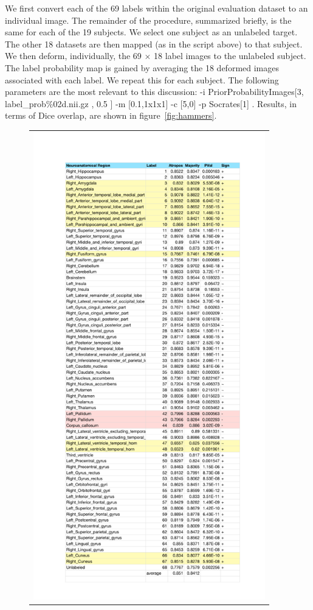 \documentclass[11pt,english]{article}
\begin{document}
{We first convert each of the 69 labels within the original evaluation
dataset to an individual image.  The remainder of the procedure,
summarized briefly, is the same for each of the 19 subjects.  We
select one subject as an unlabeled target.  The other 18 datasets are
then mapped (as in the script above) to that subject.  We then deform,
individually, the 69 $\times$ 18 label images to the unlabeled
subject.  The label probability map is gained by averaging the 18
deformed images associated with each label.  We repeat this for each
subject.  The following parameters are the most relevant to this discussion:
{\ttfamily  -i  PriorProbabilityImages[3, label\_prob\%02d.nii.gz , 0.5
  ] -m [0.1,1x1x1] -c [5,0] -p Socrates[1] }.  Results, in terms of
Dice overlap, are shown in figure~\ref{fig:hammers}.
\begin{figure}
\begin{center}
\begin{tabular}{c}
\includegraphics[height=8in]{Figures/final_results_majority_vote_vs_atropos.pdf}

\end{tabular}
\end{center}
\end{figure}}
\end{document}
